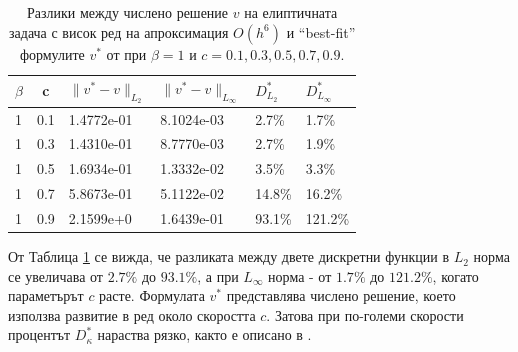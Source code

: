 \documentclass[a4paper]{article}
\theoremstyle{remark}
\begin{document}
\begin{large}
\begin{table}[ht]
\centering
\begin{tabular}{|l|c|l l|l l|}
\hline
\hline 
$\beta$	& c 	& $\|v^*-v \|_{L_2 }$ & $\|v^*-v \|_{L_\infty }$  	& $D^*_{L_2}$	& $D^*_{L_\infty }$	\\
\hline 
1& 		0.1	&	1.4772e-01 		& 	8.1024e-03 				& 2.7\%			& 1.7\%		\\
\hline 
1& 		0.3 	&	1.4310e-01 		& 	8.7770e-03				& 2.7\%			& 1.9\%		\\
\hline 
1& 		0.5 	&	1.6934e-01 		& 	1.3332e-02				& 3.5\%			& 3.3\%		\\
\hline 
1& 		0.7 	&	5.8673e-01		& 	5.1122e-02				& 14.8\%		& 16.2\%	\\
\hline 
1& 		0.9	&	2.1599e+0 		& 	1.6439e-01				& 93.1\%		& 121.2\%	\\
\hline 
\hline 
\end{tabular}
\caption{Разлики между числено решение $v$ на елиптичната задача с висок ред на апроксимация $O(h^6)$ и ``best-fit'' формулите $v^*$ от \cite{ref15} при $\beta=1$ и $c=0.1, 0.3, 0.5, 0.7, 0.9$.}
\label{tab:diff-beta1}
\end{table}
От Таблица \ref{tab:diff-beta1} се вижда, че разликата между двете дискретни функции в $L_2$ норма се увеличава от $2.7\%$ до $93.1\%$, а при $L_\infty$ норма - от $1.7\%$ до $121.2\%$, когато параметърът $c$ расте. Формулата $v^*$ представлява числено решение, което използва развитие в ред около скоростта $c$. Затова при по-големи скорости процентът $D^*_{\kappa}$ нараства рязко, както е описано в \cite{ref15}.



\end{large}
\end{document}
